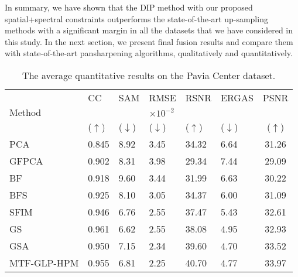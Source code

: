 \documentclass[journal]{IEEEtran}
\begin{document}
    In summary, we have shown that  the DIP method with our proposed spatial+spectral constraints outperforms the state-of-the-art up-sampling methods with a significant margin in all the datasets that we have considered in this study. In the next section, we present final fusion results and compare them with state-of-the-art pansharpening algorithms, qualitatively and quantitatively.
    
\begin{table}[tb]
        \centering
        \caption{The average quantitative results on the Pavia Center dataset.}
        \begin{tabular}{lp{0.5cm}p{0.5cm}p{0.6cm}p{0.5cm}p{0.6cm}c}
        \hline
        \multirow{3}{*}{Method}                          & CC                & SAM               & RMSE                  & RSNR              & ERGAS             & PSNR  \\
                                        &                   &                   &  $\times 10^{-2}$     &                   &                   & \\
                                        & ($\uparrow$)      & ($\downarrow$)    &  ($\downarrow$)       & ($\uparrow$)      & ($\downarrow$)    & ($\uparrow$)\\
        \hline
        PCA\cite{PCA1}                  & 0.845            & 8.92            & 3.45            & 34.32           & 6.64            & 31.26\\
        GFPCA \cite{GFPCA}              & 0.902            & 8.31            & 3.98            & 29.34           & 7.44            & 29.09\\
        BF \cite{BF}                    & 0.918            & 9.60            & 3.44            & 31.99           & 6.63            & 30.22\\
        BFS \cite{BFS}                  & 0.925            & 8.10            & 3.05            & 34.37           & 6.00            & 31.09\\
        SFIM \cite{SFIM}                & 0.946            & 6.76            & 2.55            & 37.47           & 5.43            & 32.61\\
        GS\cite{GS}                     & 0.961            & 6.62            & 2.55            & 38.08           & 4.95            & 32.93\\
        GSA\cite{GS}                    & 0.950            & 7.15            & 2.34            & 39.60           & 4.70            & 33.52\\
        MTF-GLP-HPM \cite{MTF-GLP-HPM}  & 0.955            & 6.81            & 2.25            & 40.70           & 4.77            & 33.97\\

\end{tabular}
\end{table}
\end{document}
